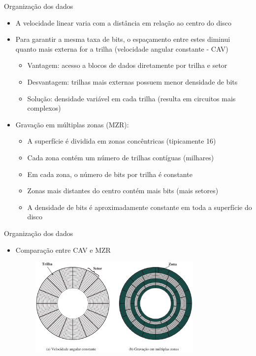 \begin{slide}{Organização dos dados}
	\begin{itemize}
		\item A velocidade linear varia com a distância em relação ao centro do disco
		\item Para garantir a mesma taxa de bits, o espaçamento entre estes diminui quanto mais externa for a trilha (velocidade angular constante - CAV)
			\begin{itemize}
				\item Vantagem: acesso a blocos de dados diretamente por trilha e setor
				\item Desvantagem: trilhas mais externas possuem menor densidade de bits
				\item Solução: densidade variável em cada trilha (resulta em circuitos mais complexos)
			\end{itemize}
		\item Gravação em múltiplas zonas (MZR):
			\begin{itemize}
				\item A superfície é dividida em zonas concêntricas (tipicamente 16)
				\item Cada zona contém um número de trilhas contíguas (milhares)
				\item Em cada zona, o número de bits por trilha é constante
				\item Zonas mais distantes do centro contém mais bits (mais setores)
				\item A densidade de bits é aproximadamente constante em toda a superfície do disco
			\end{itemize}
	\end{itemize}
\end{slide}

\begin{slide}{Organização dos dados}
	\begin{itemize}
		\item Comparação entre CAV e MZR
			\begin{figure}[h]
				\centering
				\includegraphics[width=0.8\textwidth]{figs/comparacao-layout}
			\end{figure}
	\end{itemize}
\end{slide}

